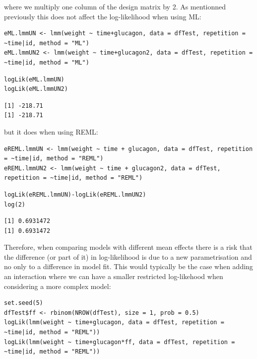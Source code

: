 \documentclass[12pt]{article}
\begin{document}
where we multiply one column of the design matrix by 2. As mentionned
previously this does not affect the log-likelihood when using ML:
\lstset{language=r,label= ,caption= ,captionpos=b,numbers=none}
\begin{lstlisting}
eML.lmmUN <- lmm(weight ~ time+glucagon, data = dfTest, repetition = ~time|id, method = "ML")
eML.lmmUN2 <- lmm(weight ~ time+glucagon2, data = dfTest, repetition = ~time|id, method = "ML")
\end{lstlisting}

\lstset{language=r,label= ,caption= ,captionpos=b,numbers=none}
\begin{lstlisting}
logLik(eML.lmmUN)
logLik(eML.lmmUN2)
\end{lstlisting}

\begin{verbatim}
[1] -218.71
[1] -218.71
\end{verbatim}


but it does when using REML:
\lstset{language=r,label= ,caption= ,captionpos=b,numbers=none}
\begin{lstlisting}
eREML.lmmUN <- lmm(weight ~ time + glucagon, data = dfTest, repetition = ~time|id, method = "REML")
eREML.lmmUN2 <- lmm(weight ~ time + glucagon2, data = dfTest, repetition = ~time|id, method = "REML")
\end{lstlisting}

\lstset{language=r,label= ,caption= ,captionpos=b,numbers=none}
\begin{lstlisting}
logLik(eREML.lmmUN)-logLik(eREML.lmmUN2)
log(2)
\end{lstlisting}

\begin{verbatim}
[1] 0.6931472
[1] 0.6931472
\end{verbatim}


Therefore, when comparing models with different mean effects there is
a risk that the difference (or part of it) in log-likelihood is due to
a new parametrisation and no only to a difference in model fit. This
would typically be the case when adding an interaction where we can
have a smaller restricted log-likehood when considering a more complex
model:

\lstset{language=r,label= ,caption= ,captionpos=b,numbers=none}
\begin{lstlisting}
set.seed(5) 
dfTest$ff <- rbinom(NROW(dfTest), size = 1, prob = 0.5)
logLik(lmm(weight ~ time+glucagon, data = dfTest, repetition = ~time|id, method = "REML"))
logLik(lmm(weight ~ time+glucagon*ff, data = dfTest, repetition = ~time|id, method = "REML"))
\end{lstlisting}
\end{document}
